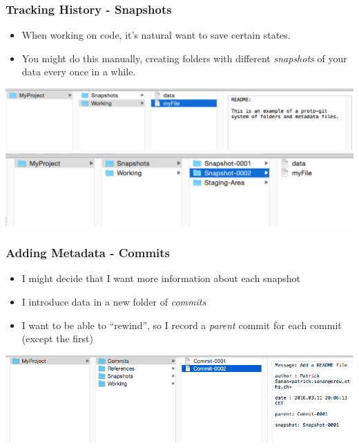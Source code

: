 \documentclass{beamer}
\begin{document}
\begin{frame}[fragile]
\frametitle{Tracking History - Snapshots}
\begin{itemize}
\item When working on code, it's natural want to save certain states.
\item You might do this manually, creating folders with different \emph{snapshots} of your data every once in a while.
\end{itemize}
\includegraphics[scale=0.4]{snapshot1.png}\\
\vspace{10px}
\includegraphics[scale=0.4]{snapshot2.png}

\end{frame}

\begin{frame}[fragile]
\frametitle{Adding Metadata - Commits}
\begin{itemize}
\item I might decide that I want more information about each snapshot
\item I introduce data in a new folder of \emph{commits} 
\item I want to be able to ``rewind'', so I record a \emph{parent} commit for each commit (except the first)
\end{itemize}
\includegraphics[scale=0.4]{commit1.png}\\
\end{frame}
\end{document}
